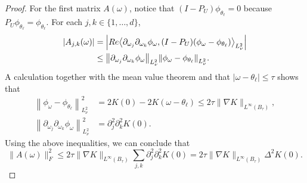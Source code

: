 \documentclass[10pt,a4paper]{amsart}
\renewcommand{\Re}{{\rm Re}}
\newcommand{\inner}[1]{{\left\langle#1\right\rangle}}
\newcommand{\norm}[1]{{\left\|#1\right\|}}
\begin{document}
\begin{proof}
	For the first matrix $A(\omega)$, notice that $(I-P_U)\phi_{\theta_\ell}=0$ because $P_U\phi_{\theta_\ell} = \phi_{\theta_\ell}$. For each $j,k\in \{1,\dots,d\}$,  
	\begin{align*}
		|A_{j,k}(\omega)|
		&=\left| \Re\inner{\partial_{\omega_j} \partial_{\omega_k} \phi_\omega,  (I-P_U) (\phi_\omega-\phi_{\theta_\ell})}_{L^2_\nu} \right| \\
		&\leq \norm{\partial_{\omega_j} \partial_{\omega_k} \phi_\omega}_{L^2_\nu}  \norm{\phi_\omega-\phi_{\theta_\ell}}_{L^2_\nu}.
	\end{align*}
	A calculation together with the mean value theorem and that $|\omega-\theta_\ell|\leq \tau$ shows that
	\begin{align*} 
		\norm{\phi_{\omega}-\phi_{\theta_\ell}}_{L^2_\nu}^2 
		&= 2K(0)-2K(\omega-\theta_\ell)
		\leq 2 \tau \|\nabla K\|_{L^\infty(B_\tau)}, \\
		\norm{\partial_{\omega_j} \partial_{\omega_k} \phi_\omega}_{L^2_\nu}^2
		&=\partial_j^2 \partial_k^2 K(0).  
	\end{align*}
	Using the above inequalities, we can conclude that 
	\begin{equation}
		\|A(\omega)\|_F^2
		\leq 2 \tau \|\nabla K\|_{L^\infty(B_\tau)} \sum_{j,k}  \partial_j^2 \partial_k^2 K(0)
		= 2 \tau \|\nabla K\|_{L^\infty(B_\tau)} \Delta^2 K(0).
		\label{eq:hessianq2}
	\end{equation}
	

\end{proof}
\end{document}
